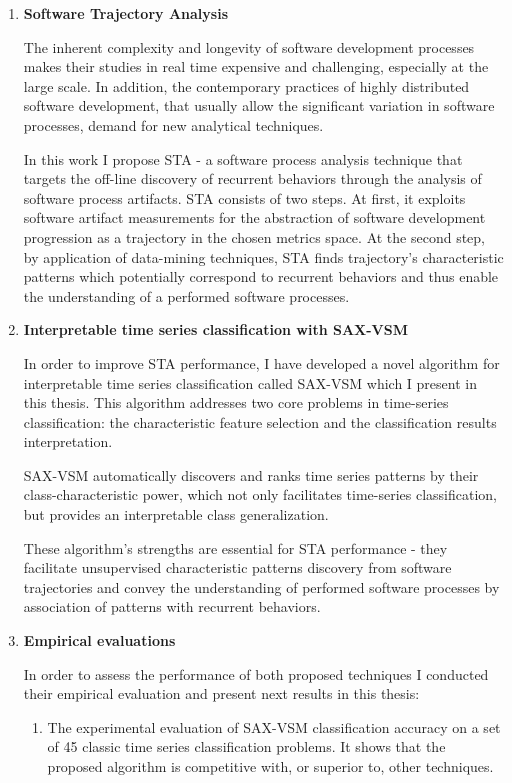 \begin{enumerate}

\item \textbf{Software Trajectory Analysis}

The inherent complexity and longevity of software development processes makes their studies in real time
expensive and challenging, especially at the large scale. 
In addition, the contemporary practices of highly distributed software development, that usually allow 
the significant variation in software processes, demand for new analytical techniques.

In this work I propose STA - a software process analysis technique that targets the off-line discovery 
of recurrent behaviors through the analysis of software process artifacts. 
STA consists of two steps. 
At first, it exploits software artifact measurements for the abstraction of software development 
progression as a trajectory in the chosen metrics space. 
At the second step, by application of data-mining techniques, STA finds trajectory's characteristic 
patterns which potentially correspond to recurrent behaviors and thus enable the understanding of a 
performed software processes.

\item \textbf{Interpretable time series classification with SAX-VSM}

In order to improve STA performance, I have developed a novel algorithm for interpretable time 
series classification called SAX-VSM which I present in this thesis. 
This algorithm addresses two core problems in time-series classification: 
the characteristic feature selection and the classification results interpretation. 

SAX-VSM automatically discovers and ranks time series patterns by their
class-characteristic power, 
which not only facilitates time-series classification, but provides an interpretable class
generalization.

These algorithm's strengths are essential for STA performance - they facilitate unsupervised characteristic 
patterns discovery from software trajectories and convey the understanding of performed software processes 
by association of patterns with recurrent behaviors.

\item \textbf{Empirical evaluations}

In order to assess the performance of both proposed techniques I conducted their empirical evaluation and 
present next results in this thesis:
\begin{enumerate}
 \item The experimental evaluation of SAX-VSM classification accuracy on a set of 45 classic time series 
classification problems. It shows that the proposed algorithm is competitive with, or superior
to, other 
techniques.


\end{enumerate}
\end{enumerate}
